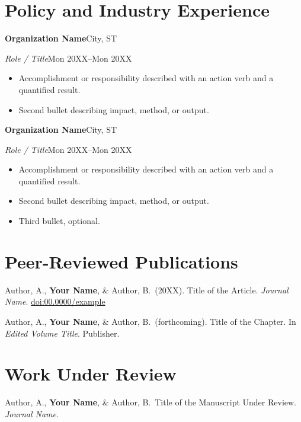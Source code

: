 \documentclass[10pt]{extarticle}
\newcommand{\entry}[5]{%
  \noindent\textbf{#1}\hfill #2\par
  \noindent\textit{#3}\hfill #4\par
  \begin{itemize}#5\end{itemize}%
}
\newcommand{\entrygap}{\vspace{0.5em}}
\begin{document}
\section*{Policy and Industry Experience}
\entry
  {Organization Name}{City, ST}
  {Role / Title}{Mon 20XX--Mon 20XX}
  {\item Accomplishment or responsibility described with an action verb and a quantified result.
   \item Second bullet describing impact, method, or output.}
\entrygap
\entry
  {Organization Name}{City, ST}
  {Role / Title}{Mon 20XX--Mon 20XX}
  {\item Accomplishment or responsibility described with an action verb and a quantified result.
   \item Second bullet describing impact, method, or output.
   \item Third bullet, optional.}

\section*{Peer-Reviewed Publications}
\begin{publist}
  \item Author, A., \textbf{Your Name}, \& Author, B.\ (20XX). Title of the Article. \textit{Journal Name}. \href{https://example.com}{doi:00.0000/example}
  \item Author, A., \textbf{Your Name}, \& Author, B.\ (forthcoming). Title of the Chapter. In \textit{Edited Volume Title}. Publisher.
\end{publist}

\section*{Work Under Review}
\begin{publist}
  \item Author, A., \textbf{Your Name}, \& Author, B.\ Title of the Manuscript Under Review. \textit{Journal Name}.
\end{publist}
\end{document}
